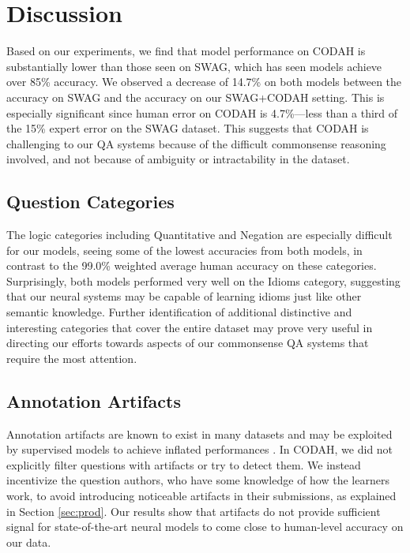 \documentclass[11pt,a4paper]{article}
\begin{document}
\section{Discussion}
    Based on our experiments, we find that model performance on CODAH is substantially lower than those seen on SWAG, which has seen models achieve over 85\% accuracy. We observed a decrease of 14.7\% on both models between the accuracy on SWAG and the accuracy on our SWAG+CODAH setting. This is especially significant since human error on CODAH is 4.7\%---less than a third of the 15\% expert error on the SWAG dataset. This suggests that CODAH is challenging to our QA systems because of the difficult commonsense reasoning involved, and not because of ambiguity or intractability in the dataset.
    
    \subsection{Question Categories}
    The logic categories including Quantitative and Negation are especially difficult for our models, seeing some of the lowest accuracies from both models, in contrast to the 99.0\% weighted average human accuracy on these categories. Surprisingly, both models performed very well on the Idioms category, suggesting that our neural systems may be capable of learning idioms just like other semantic knowledge.  Further identification of additional distinctive and interesting categories that cover the entire dataset may prove very useful in directing our efforts towards aspects of our commonsense QA systems that require the most attention.
    
    \subsection{Annotation Artifacts}
    Annotation artifacts are known to exist in many datasets and may be exploited by supervised models to achieve inflated performances \cite{gururangan2018annotation}. In CODAH, we did not explicitly filter questions with artifacts or try to detect them. We instead incentivize the question authors, who have some knowledge of how the learners work, to avoid introducing noticeable artifacts in their submissions, as explained in Section \ref{sec:prod}. Our results show that artifacts do not provide sufficient signal for state-of-the-art neural models to come close to human-level accuracy on our data. 
    
\end{document}
